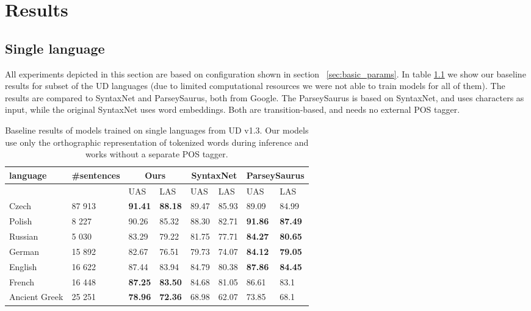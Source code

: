 \chapter{Results}

\section{Single language}
All experiments depicted in this section are based on configuration shown in section
~\ref{sec:basic_params}. In table \ref{tab:universal} we show our baseline results
for subset of the UD languages (due to limited computational resources we were
not able to train models for all of them). The results are compared to
SyntaxNet\cite{andor_globally_2016} and ParseySaurus\cite{alberti_parsey_saurus_2017},
both from Google. The ParseySaurus is based on SyntaxNet, and uses characters
as input, while the original SyntaxNet uses word embeddings. Both are transition-based,
and needs no external POS tagger.

\begin{table}[!htbp]
  \centering
  \begin{tabular}{l l | l l | l l | l l}
    language & \#sentences & \multicolumn{2}{c|}{Ours} & \multicolumn{2}{c|}{SyntaxNet} & \multicolumn{2}{c}{ParseySaurus} \\ \hline
    & & UAS & LAS & UAS & LAS & UAS & LAS\\ \hline
    Czech & 87 913 & \textbf{91.41} & \textbf{88.18} & 89.47 & 85.93 & 89.09 & 84.99 \\
    Polish & 8 227 & 90.26 & 85.32 & 88.30 & 82.71 & \textbf{91.86} & \textbf{87.49}\\
    Russian & 5 030 & 83.29 & 79.22 & 81.75 & 77.71 & \textbf{84.27} & \textbf{80.65} \\
    German & 15 892 & 82.67 & 76.51 & 79.73 & 74.07 & \textbf{84.12} & \textbf{79.05}\\
    English & 16 622 & 87.44 & 83.94 & 84.79 & 80.38 & \textbf{87.86} & \textbf{84.45}\\ 
    French & 16 448 & \textbf{87.25} & \textbf{83.50} & 84.68 & 81.05 & 86.61 & 83.1\\
    Ancient Greek & 25 251 & \textbf{78.96} & \textbf{72.36} & 68.98 & 62.07 & 73.85 & 68.1
  \end{tabular}
  \caption{Baseline results of models trained on single languages from
    UD v1.3. Our models use only the orthographic representation of
    tokenized words during inference and works without a separate POS tagger.}
  \label{tab:universal}
\end{table}

